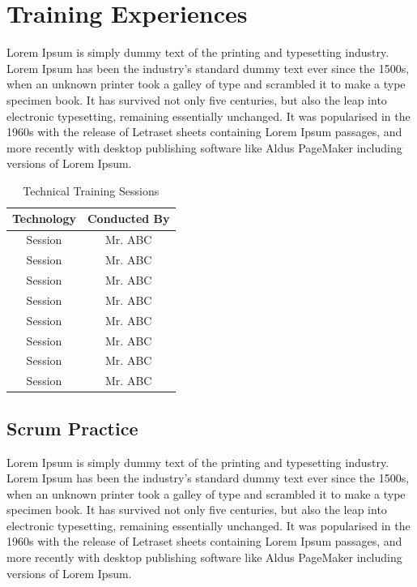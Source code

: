 \documentclass[12pt,a4paper]{report}
\begin{document}
\chapter{Training Experiences}

Lorem Ipsum is simply dummy text of the printing and typesetting industry. Lorem Ipsum has been the industry's standard dummy text ever since the 1500s, when an unknown printer took a galley of type and scrambled it to make a type specimen book. It has survived not only five centuries, but also the leap into electronic typesetting, remaining essentially unchanged. It was popularised in the 1960s with the release of Letraset sheets containing Lorem Ipsum passages, and more recently with desktop publishing software like Aldus PageMaker including versions of Lorem Ipsum.

\begin{table}[!ht]
   \centering   \begin{tabular}{| c || c |}\hline \label{tbl:Technical Training Sessions} 
		Technology & Conducted By \\ \hline
		Session & Mr. ABC\\
		Session & Mr. ABC\\
		Session & Mr. ABC\\
		Session & Mr. ABC\\
		Session & Mr. ABC\\
		Session & Mr. ABC\\
		Session & Mr. ABC\\
		Session & Mr. ABC\\ \hline
	\end{tabular}
   \caption{Technical Training Sessions}
   \label{tab:TechnicalTraining}
\end{table}


\section{Scrum Practice}
Lorem Ipsum is simply dummy text of the printing and typesetting industry. Lorem Ipsum has been the industry's standard dummy text ever since the 1500s, when an unknown printer took a galley of type and scrambled it to make a type specimen book. It has survived not only five centuries, but also the leap into electronic typesetting, remaining essentially unchanged. It was popularised in the 1960s with the release of Letraset sheets containing Lorem Ipsum passages, and more recently with desktop publishing software like Aldus PageMaker including versions of Lorem Ipsum.
\end{document}
